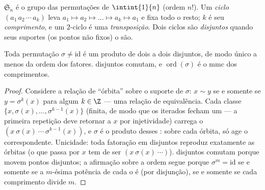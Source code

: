 \begin{definition}\label{def:b2:structures:sn}
$\mathfrak{S}_n$ é o grupo das permutações de $\intint{1}{n}$
(ordem $n!$). Um \emph{ciclo} $(a_1\,a_2\,\cdots\,a_k)$
leva $a_1 \mapsto a_2 \mapsto \dots \mapsto a_k \mapsto a_1$ e
fixa todo o resto; $k$ é seu \emph{comprimento}, e um $2$-ciclo é uma
\emph{transposição}. Dois ciclos são
\emph{disjuntos} quando seus
suportes (os pontos não fixos) o são.
\end{definition}

\begin{theorem}\label{thm:b2:structures:cycles}
Toda permutação $\sigma \neq \mathrm{id}$ é um produto de  dois a dois
disjuntos, de modo único a menos da ordem dos fatores. 
disjuntos comutam, e $\operatorname{ord}(\sigma)$ é o mmc dos
comprimentos.
\end{theorem}

\begin{proof}
Considere a relação de ``órbita'' sobre o suporte de $\sigma$: $x \sim y$
se e somente se $y = \sigma^k(x)$ para algum $k \in \Z$ --- uma relação de
equivalência. Cada classe $\{x, \sigma(x), \dots, \sigma^{k-1}(x)\}$
(finita, de modo que os iterados fecham um  --- a primeira repetição deve
retornar a $x$ por injetividade) carrega o  $(x\ \sigma(x)\
\cdots\ \sigma^{k-1}(x))$, e $\sigma$ é o produto desses
: sobre cada órbita, só age o  correspondente.
Unicidade: toda fatoração em \omterm{def:b2:structures:sn}{ciclos} disjuntos reproduz exatamente as
órbitas (o \omterm{def:b2:structures:sn}{ciclo} que passa por $x$ tem de ser $(x\ \sigma(x)\ \cdots)$).
\omterm{def:b2:structures:sn}{Ciclos} disjuntos comutam porque movem pontos disjuntos; a afirmação sobre a ordem
segue porque $\sigma^m = \mathrm{id}$ se e somente se a $m$-ésima potência de cada  o
é (por disjunção), se e somente se cada comprimento divide $m$.
\end{proof}

